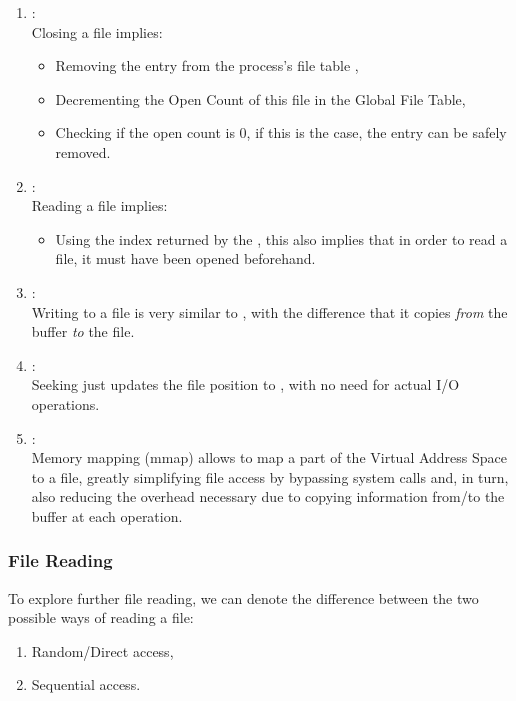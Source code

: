 \documentclass[openright, twoside]{report}
\theoremstyle{definition}
\theoremstyle{example}
\begin{document}
\begin{enumerate}
\begin{itemize}
	\end{itemize}

	\item {}:\\
	Closing a file implies:
	\begin{itemize}
		\item Removing the entry from the process's file table ,
		\item Decrementing the Open Count of this file in the Global File Table,
		\item Checking if the open count is 0, if this is the case, the entry can 
		be safely removed.
	\end{itemize}

	\item {}:\\
	Reading a file implies:
	\begin{itemize}
		\item Using the index returned by the ,
		this also implies that in order to read a file, it must have been opened 
		beforehand.
	\end{itemize}

	\item {}:\\
	Writing to a file is very similar to , with the difference 
	that it copies \emph{from} the buffer \emph{to} the file.

	\item {}:\\
	Seeking just updates the file position to , with no need for 
	actual I/O operations.

	\item {}:\\
	Memory mapping (mmap) allows to map a part of the Virtual Address Space to a file,
	greatly simplifying file access by bypassing system calls and, in turn, also 
	reducing the overhead necessary due to copying information from/to the buffer at 
	each operation.
\end{enumerate}

\subsubsection{File Reading}
To explore further  file reading, we can denote the difference between 
the two possible ways of reading a file: 

\begin{enumerate}
	\item Random/Direct access,
	\item Sequential access.
\end{enumerate}
\end{document}
